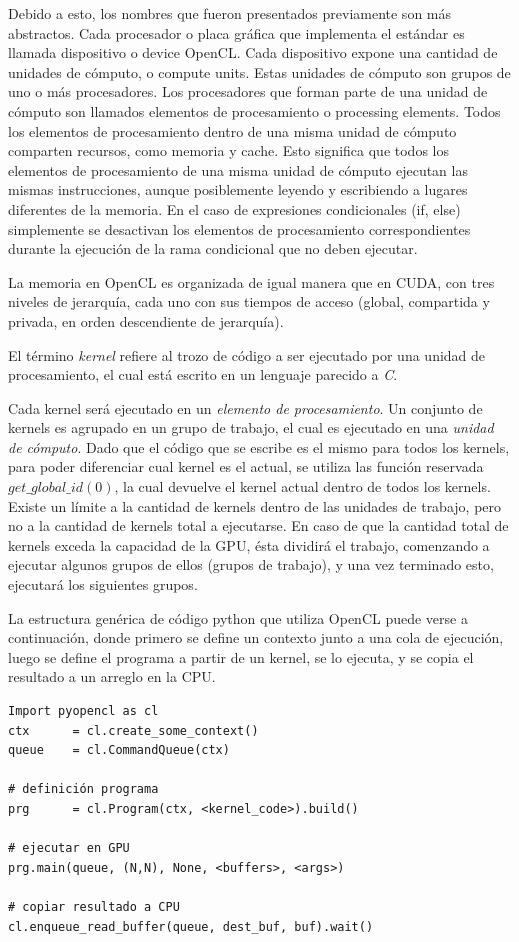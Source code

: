 Debido a esto, los nombres que fueron presentados previamente son más abstractos.
Cada procesador o placa gráfica que implementa el estándar es llamada dispositivo o device OpenCL. Cada dispositivo expone una cantidad de unidades de cómputo, o compute units. Estas unidades de cómputo son grupos de uno o más procesadores.
Los procesadores que forman parte de una unidad de cómputo son llamados elementos
de procesamiento o processing elements.
Todos los elementos de procesamiento dentro de una misma unidad de cómputo comparten recursos, como memoria y cache.
Esto significa que todos los elementos de procesamiento de una misma unidad de cómputo ejecutan las mismas instrucciones, aunque posiblemente leyendo y escribiendo a lugares diferentes de la memoria. En el caso de expresiones condicionales (if, else) simplemente se desactivan los elementos de procesamiento correspondientes durante la ejecución de la rama condicional que no deben ejecutar.

La memoria en OpenCL es organizada de igual manera que en CUDA, con tres niveles de jerarquía, cada uno con sus tiempos de acceso (global, compartida y privada, en orden descendiente de jerarquía).

El término {\em kernel} refiere al trozo de código a ser ejecutado por una unidad de procesamiento, el cual está escrito en un lenguaje parecido a {\em C}.

Cada kernel será ejecutado en un {\em elemento de procesamiento}.
Un conjunto de kernels es agrupado en un grupo de trabajo, el cual es ejecutado en una {\em unidad de cómputo}.
Dado que el código que se escribe es el mismo para todos los kernels, para poder diferenciar cual kernel es el actual, se utiliza las función reservada $get\_global\_id(0)$, la cual devuelve el kernel actual dentro de todos los kernels.
Existe un límite a la cantidad de kernels dentro de las unidades de trabajo, pero no a la cantidad de kernels total a ejecutarse.
En caso de que la cantidad total de kernels exceda la capacidad de la GPU, ésta dividirá el trabajo, comenzando a ejecutar algunos grupos de ellos (grupos de trabajo), y una vez terminado esto, ejecutará los siguientes grupos.


La estructura genérica de código python que utiliza OpenCL puede verse a continuación,
donde primero se define un contexto junto a una cola de ejecución, luego se define el programa a partir de un kernel, se lo ejecuta, y se copia el resultado a un arreglo en la CPU.

\begin{verbatim}
Import pyopencl as cl
ctx      = cl.create_some_context()
queue    = cl.CommandQueue(ctx)

# definición programa
prg      = cl.Program(ctx, <kernel_code>).build()

# ejecutar en GPU
prg.main(queue, (N,N), None, <buffers>, <args>) 

# copiar resultado a CPU
cl.enqueue_read_buffer(queue, dest_buf, buf).wait()
\end{verbatim}

